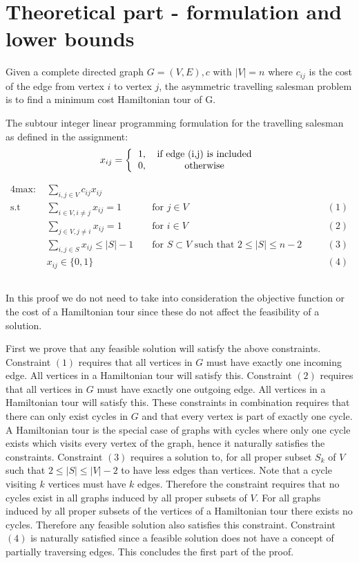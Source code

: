\section{Theoretical part - formulation and lower bounds}
Given a complete directed graph $G = (V,E),c$ with $|V| = n$ where $c_{ij}$ is the cost of the edge from vertex $i$ to vertex $j$, the asymmetric travelling salesman problem is to find a minimum cost Hamiltonian tour of G.

The subtour integer linear programming formulation for the travelling salesman as defined in the assignment:
\[ 
x_{ij} =
\left \{
  \begin{tabular}{cc}
  1, & if edge (i,j) is included\\
  0, & otherwise 
  \end{tabular}
\right .
\]

\begin{alignat*}{4}
\text{max: }    & \sum_{i,j \in V} c_{ij} x_{ij}\\
\text{s.t }     & \sum_{i \in V, i \neq j} x_{ij} = 1  && \text{ for } j \in V && (1)\\
                & \sum_{j \in V, j \neq i} x_{ij} = 1  && \text{ for } i \in V && (2)\\
                & \sum_{i,j \in S} x_{ij} \leq |S| - 1 && \text{ for } S \subset V \text{ such that } 2 \leq |S| \leq n - 2 \quad && (3)\\
                & x_{ij} \in \{0,1\} && && (4)
\end{alignat*}

\subsection{} %
In this proof we do not need to take into consideration the objective function or the cost of a Hamiltonian tour since these do not affect the feasibility of a solution.

First we prove that any feasible solution will satisfy the above constraints. Constraint $(1)$ requires that all vertices in $G$ must have exactly one incoming edge. All vertices in a Hamiltonian tour will satisfy this. Constraint $(2)$ requires that all vertices in $G$ must have exactly one outgoing edge. All vertices in a Hamiltonian tour will satisfy this. These constraints in combination requires that there can only exist cycles in $G$ and that every vertex is part of exactly one cycle. A Hamiltonian tour is the special case of graphs with cycles where only one cycle exists which visits every vertex of the graph, hence it naturally satisfies the constraints. Constraint $(3)$ requires a solution to, for all proper subset $S_k $ of $V$ such that $2 \leq |S| \leq |V| - 2$ to have less edges than vertices. Note that a cycle visiting $k$ vertices must have $k$ edges. Therefore the constraint requires that no cycles exist in all graphs induced by all proper subsets of $V$. For all graphs induced by all proper subsets of the vertices of a Hamiltonian tour there exists no cycles. Therefore any feasible solution also satisfies this constraint. Constraint $(4)$ is naturally satisfied since a feasible solution does not have a concept of partially traversing edges. This concludes the first part of the proof.


